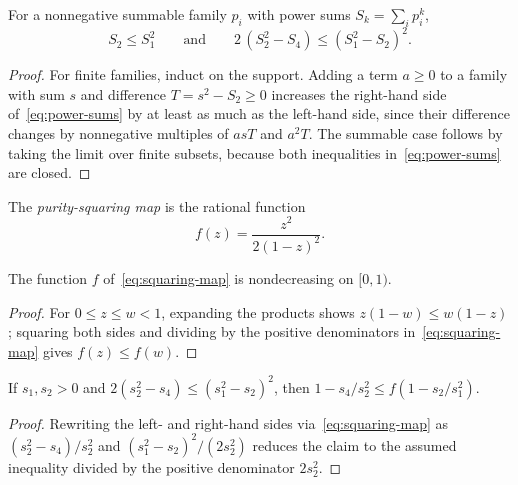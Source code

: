 \begin{lemma}
  \label{lem:power-sums}
  \leanok
  For a nonnegative summable family \(p_i\) with power sums \(S_k = \sum_i p_i^k\),
  \begin{equation}
    \label{eq:power-sums}
    S_2 \le S_1^2 \qquad\text{and}\qquad 2\,(S_2^2 - S_4) \le (S_1^2 - S_2)^2.
  \end{equation}
\end{lemma}
\begin{proof}
  \leanok
  For finite families, induct on the support. Adding a term \(a \ge 0\) to a family with sum \(s\)
  and difference \(T = s^2 - S_2 \ge 0\) increases the right-hand side of~\eqref{eq:power-sums} by
  at least as much as the left-hand side, since their difference changes by nonnegative multiples of
  \(a s T\) and \(a^2 T\). The summable case follows by taking the limit over finite subsets,
  because both inequalities in~\eqref{eq:power-sums} are closed.
\end{proof}

\begin{definition}
  \label{def:squaring-defect}
  \leanok
  The \emph{purity-squaring map} is the rational function
  \begin{equation}
    \label{eq:squaring-map}
    f(z) = \frac{z^2}{2(1 - z)^2}.
  \end{equation}
\end{definition}

\begin{lemma}
  \label{lem:f-mono}
  \leanok
  The function \(f\) of~\eqref{eq:squaring-map} is nondecreasing on \([0, 1)\).
\end{lemma}
\begin{proof}
  \leanok
  For \(0 \le z \le w < 1\), expanding the products shows \(z (1 - w) \le w (1 - z)\); squaring
  both sides and dividing by the positive denominators in~\eqref{eq:squaring-map} gives
  \(f(z) \le f(w)\).
\end{proof}

\begin{lemma}
  \label{lem:squaring-homogeneous}
  \leanok
  If \(s_1, s_2 > 0\) and \(2 (s_2^2 - s_4) \le (s_1^2 - s_2)^2\), then
  \(1 - s_4/s_2^2 \le f(1 - s_2/s_1^2)\).
\end{lemma}
\begin{proof}
  \leanok
  Rewriting the left- and right-hand sides via~\eqref{eq:squaring-map} as
  \((s_2^2 - s_4)/s_2^2\) and \((s_1^2 - s_2)^2 / (2 s_2^2)\) reduces the claim to the assumed
  inequality divided by the positive denominator \(2s_2^2\).
\end{proof}

